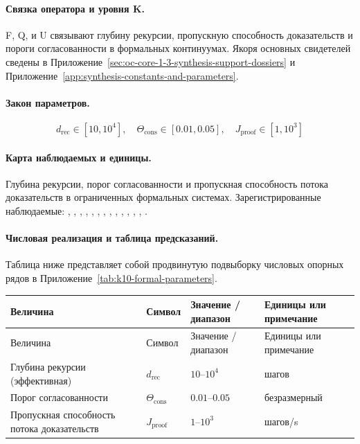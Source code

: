 \paragraph{Связка оператора и уровня K.}
F, Q, и U связывают глубину рекурсии, пропускную способность доказательств и пороги согласованности в формальных континуумах.
Якоря основных свидетелей сведены в Приложение~\ref{sec:oc-core-1-3-synthesis-support-dossiers} и Приложение~\ref{app:synthesis-constants-and-parameters}.

\paragraph{Закон параметров.}
\[
d_{\mathrm{rec}} \in [10,10^4],\quad \Theta_{\mathrm{cons}} \in [0.01,0.05],\quad J_{\mathrm{proof}} \in [1,10^3]
\]

\paragraph{Карта наблюдаемых и единицы.}
Глубина рекурсии, порог согласованности и пропускная способность потока доказательств в ограниченных формальных системах.
Зарегистрированные наблюдаемые: , \allowbreak {}, \allowbreak {}, \allowbreak {}, \allowbreak {}, \allowbreak {}, \allowbreak {}, \allowbreak {}, \allowbreak {}, \allowbreak {}, \allowbreak {}, \allowbreak {}, \allowbreak {}, \allowbreak {}.

\paragraph{Числовая реализация и таблица предсказаний.}
Таблица ниже представляет собой продвинутую подвыборку числовых опорных рядов в Приложение~\ref{tab:k10-formal-parameters}.
\begin{longtable}{@{}L{0.27\textwidth}L{0.15\textwidth}L{0.24\textwidth}L{0.16\textwidth}@{}}
\toprule
Величина & Символ & Значение / диапазон & Единицы или примечание \\
\midrule
\endfirsthead
\toprule
Величина & Символ & Значение / диапазон & Единицы или примечание \\
\midrule
\endhead
Глубина рекурсии (эффективная) & $\scriptstyle d_{\mathrm{rec}}$ & $10\text{--}10^4$ & шагов \\
Порог согласованности & $\scriptstyle \Theta_{\mathrm{cons}}$ & $0.01\text{--}0.05$ & безразмерный \\
Пропускная способность потока доказательств & $\scriptstyle J_{\mathrm{proof}}$ & $1\text{--}10^3$ & шагов/s \\
\bottomrule
\end{longtable}

